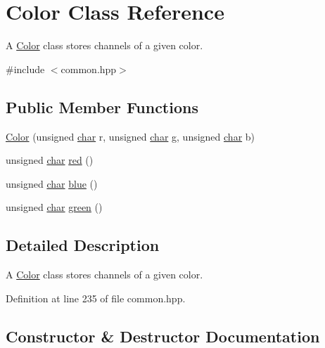 \hypertarget{classColor}{}\section{Color Class Reference}
\label{classColor}


A \hyperlink{classColor}{Color} class stores channels of a given color.  




{\ttfamily \#include $<$common.\+hpp$>$}

\subsection*{Public Member Functions}
\begin{DoxyCompactItemize}
\item 
\hyperlink{classColor_a01fc8b90de599a12365e87b9a0719264}{Color} (unsigned \hyperlink{CMakeCache_8txt_afe71f11dacb15682cdc012f7208e6e09}{char} r, unsigned \hyperlink{CMakeCache_8txt_afe71f11dacb15682cdc012f7208e6e09}{char} g, unsigned \hyperlink{CMakeCache_8txt_afe71f11dacb15682cdc012f7208e6e09}{char} b)
\item 
unsigned \hyperlink{CMakeCache_8txt_afe71f11dacb15682cdc012f7208e6e09}{char} \hyperlink{classColor_a2f9d30801b6b81186cad649bb625b98f}{red} ()
\item 
unsigned \hyperlink{CMakeCache_8txt_afe71f11dacb15682cdc012f7208e6e09}{char} \hyperlink{classColor_ad03144614edc7c54fd0fe0132af47213}{blue} ()
\item 
unsigned \hyperlink{CMakeCache_8txt_afe71f11dacb15682cdc012f7208e6e09}{char} \hyperlink{classColor_aca8e95502aec09dfc92a09087bf62990}{green} ()
\end{DoxyCompactItemize}


\subsection{Detailed Description}
A \hyperlink{classColor}{Color} class stores channels of a given color. 

Definition at line 235 of file common.\+hpp.



\subsection{Constructor \& Destructor Documentation}
